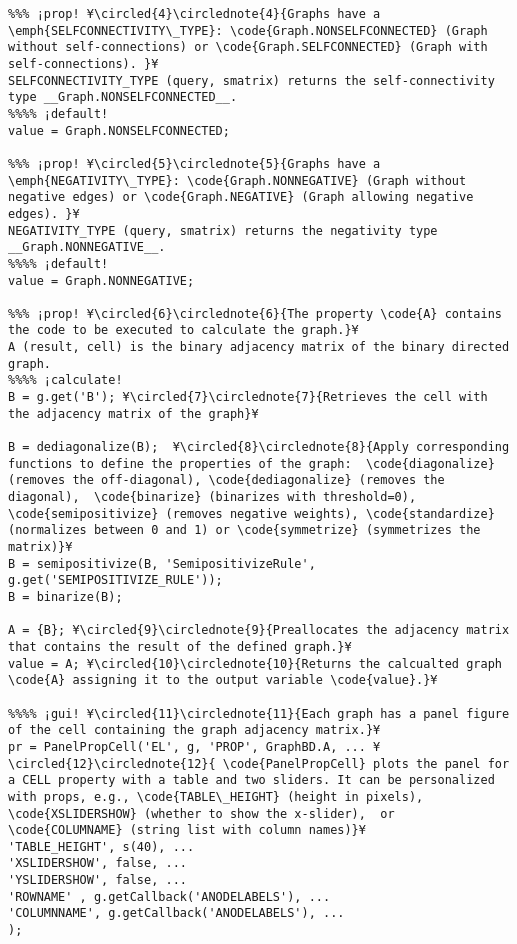 \documentclass{tufte-handout}
\begin{document}
\begin{lstlisting}
%%% ¡prop! ¥\circled{4}\circlednote{4}{Graphs have a \emph{SELFCONNECTIVITY\_TYPE}: \code{Graph.NONSELFCONNECTED} (Graph without self-connections) or \code{Graph.SELFCONNECTED} (Graph with self-connections). }¥
SELFCONNECTIVITY_TYPE (query, smatrix) returns the self-connectivity type __Graph.NONSELFCONNECTED__.
%%%% ¡default!
value = Graph.NONSELFCONNECTED;

%%% ¡prop! ¥\circled{5}\circlednote{5}{Graphs have a \emph{NEGATIVITY\_TYPE}: \code{Graph.NONNEGATIVE} (Graph without negative edges) or \code{Graph.NEGATIVE} (Graph allowing negative edges). }¥
NEGATIVITY_TYPE (query, smatrix) returns the negativity type __Graph.NONNEGATIVE__.
%%%% ¡default!
value = Graph.NONNEGATIVE;

%%% ¡prop! ¥\circled{6}\circlednote{6}{The property \code{A} contains the code to be executed to calculate the graph.}¥
A (result, cell) is the binary adjacency matrix of the binary directed graph.
%%%% ¡calculate!
B = g.get('B'); ¥\circled{7}\circlednote{7}{Retrieves the cell with the adjacency matrix of the graph}¥

B = dediagonalize(B);  ¥\circled{8}\circlednote{8}{Apply corresponding functions to define the properties of the graph:  \code{diagonalize} (removes the off-diagonal), \code{dediagonalize} (removes the diagonal),  \code{binarize} (binarizes with threshold=0), \code{semipositivize} (removes negative weights), \code{standardize} (normalizes between 0 and 1) or \code{symmetrize} (symmetrizes the matrix)}¥
B = semipositivize(B, 'SemipositivizeRule', g.get('SEMIPOSITIVIZE_RULE')); 
B = binarize(B); 

A = {B}; ¥\circled{9}\circlednote{9}{Preallocates the adjacency matrix that contains the result of the defined graph.}¥
value = A; ¥\circled{10}\circlednote{10}{Returns the calcualted graph \code{A} assigning it to the output variable \code{value}.}¥

%%%% ¡gui! ¥\circled{11}\circlednote{11}{Each graph has a panel figure of the cell containing the graph adjacency matrix.}¥
pr = PanelPropCell('EL', g, 'PROP', GraphBD.A, ... ¥\circled{12}\circlednote{12}{ \code{PanelPropCell} plots the panel for a CELL property with a table and two sliders. It can be personalized with props, e.g., \code{TABLE\_HEIGHT} (height in pixels), \code{XSLIDERSHOW} (whether to show the x-slider),  or \code{COLUMNAME} (string list with column names)}¥
'TABLE_HEIGHT', s(40), ... 
'XSLIDERSHOW', false, ... 
'YSLIDERSHOW', false, ...  
'ROWNAME' , g.getCallback('ANODELABELS'), ... 
'COLUMNNAME', g.getCallback('ANODELABELS'), ...
);








\end{lstlisting}
\end{document}
